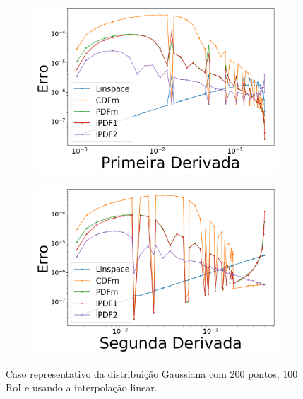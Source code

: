 \begin{figure}[H]
	\begin{subfigure}[b]{0.45\textwidth}
		\centering 
		\includegraphics[width=\textwidth]{./figuras/error_normal_linear_Primeira_Derivada_1.png}
		\caption{}
		\label{fig:11c}
	\end{subfigure}
	\hfill
	\begin{subfigure}[b]{0.45\textwidth}
		\centering 
		\includegraphics[width=\textwidth]{./figuras/error_normal_linear_Segunda_Derivada_1.png}
		\caption{}
		\label{fig:11d}
	\end{subfigure}
	\caption{Caso representativo da distribuição Gaussiana com 200 pontos, 100 \ac{RoI} e usando a interpolação linear.}\label{fig:11}
\end{figure}

